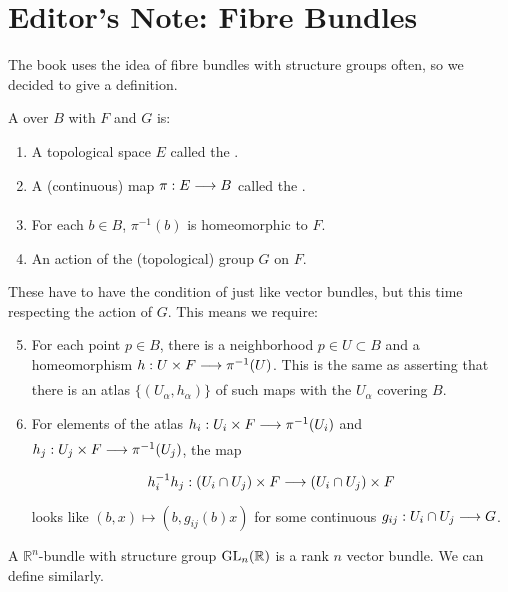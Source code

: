 \documentclass[../main]{subfiles}
\begin{document}
\section{Editor's Note: Fibre Bundles}
The book uses the idea of fibre bundles with structure groups often, so we decided to give a definition. 

\begin{definition}
A  over $B$ with  $F$ and  $G$ is:
\begin{enumerate}[label = \arabic*)]
    \item A topological space $E$ called the .
    \item A (continuous) map $\pi:E\varrightarrow{} B$ called the .
    \item For each $b\in B$, $\pi^{-1}(b)$ is homeomorphic to $F$.
    \item An action of the (topological) group $G$ on $F$.
\end{enumerate}
These have to have the condition of  just like vector bundles, but this time respecting the action of $G$. This means we require:
\begin{enumerate}[label = \arabic*)]\setcounter{enumi}{4}
    \item For each point $p\in B$, there is a neighborhood $p\in U\subset B$ and a homeomorphism $h:U\times F\varrightarrow{} \pi^{-1}(U)$. This is the same as asserting that there is an atlas $\{(U_\alpha,h_\alpha)\}$ of such maps with the $U_\alpha$ covering $B$.
    \item For elements of the atlas $h_i:U_i\times F\varrightarrow{} \pi^{-1}(U_i)$ and \newline$h_j:U_j\times F\varrightarrow{} \pi^{-1}(U_j)$,  the map \[h_i^{-1}h_j:(U_i\cap U_j)\times F\varrightarrow{}(U_i\cap U_j)\times F\]  looks like $(b,x)\mapsto (b, g_{ij}(b)x) $ for some continuous $g_{ij}: U_i\cap U_j \varrightarrow{} G$.
\end{enumerate}

\end{definition}

\begin{note}
A $\mathbb{R}^n$-bundle with structure group $\operatorname{GL}_n(\mathbb{R})$ is a rank $n$ vector bundle. We can define  similarly.
\end{note}
\end{document}
